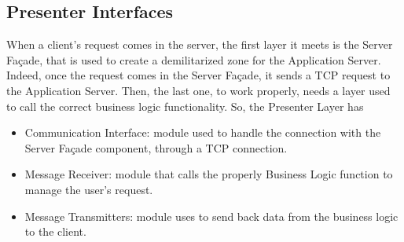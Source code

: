 \subsection*{Presenter Interfaces}
When a client's request comes in the server, the first layer it meets is the Server Façade, that is used to create a demilitarized zone for the Application Server. Indeed, once the request comes in the Server Façade, it sends a TCP request to the Application Server. Then, the last one, to work properly, needs a layer used to call the correct business logic functionality. So, the Presenter Layer has
\begin{itemize}
    \item Communication Interface: module used to handle the connection with the Server Façade component, through a TCP connection.
    \item Message Receiver: module that calls the properly Business Logic function to manage the user's request.
    \item Message Transmitters: module uses to send back data from the business logic to the client.
\end{itemize}

